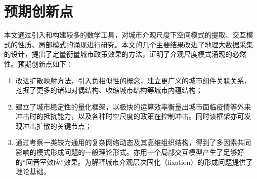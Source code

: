 \section{预期创新点}

本文通过引入和构建较多的数学工具，对城市介观尺度下空间模式的提取、交互模式的性质、局部模式的涌现进行研究。本文的几个主要结果改进了地理大数据采集的设计，提出了定量衡量城市政策效果的方法，证明了介观尺度模式涌现的必然性。预期创新点如下：\begin{enumerate}
    \item 改进扩散映射方法，引入负相似性的概念，建立更广义的城市组件关联关系，挖掘了更多的诸如对偶结构、收缩城市结构等城市内蕴结构；
    \item 建立了城市稳定性的量化框架，以极快的运算效率衡量出城市面临疫情等外来冲击时的抵抗能力，以及各种时空尺度的政策在控制冲击。同时该框架亦可发现冲击扩散的关键节点；
    \item 通过考察一类较为通用的复杂网络动态及其高维组织结构，得到了多因素共同影响的模式形成问题的一般理论形式。亦用一个局部交互模型产生了足够好的“回音室效应”效果。为解释城市介观层次固化（fixation）的形成问题提供了理论基础。
\end{enumerate}